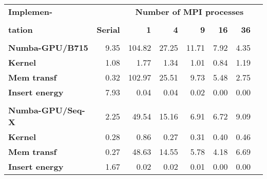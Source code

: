 \begin{tabular}{lrrrrrrr}\toprule
\textbf{Implemen-} & &\multicolumn{5}{c}{\textbf{Number of MPI processes}} \\
\cline{3-7}\vspace{-10pt} & & & & & & \\
\textbf{tation} &\textbf{Serial} &\textbf{1} &\textbf{4} &\textbf{9} &\textbf{16} &\textbf{36} \\
\toprule\vspace{-11pt} & & & & & & \\
\textbf{Numba-GPU/B715} &9.35 &104.82 &27.25 &11.71 &7.92 &4.35 \\
\quad\textbf{Kernel} &1.08 &1.77 &1.34 &1.01 &0.84 &1.19 \\
\quad\textbf{Mem transf} &0.32 &102.97 &25.51 &9.73 &5.48 &2.75 \\
\quad\textbf{Insert energy} &7.93 &0.04 &0.04 &0.02 &0.00 &0.00 \\
\midrule[0.1pt]\vspace{-10pt} & & & & & & \\
\textbf{Numba-GPU/Seq-X} &2.25 &49.54 &15.16 &6.91 &6.72 &9.09 \\
\quad\textbf{Kernel} &0.28 &0.86 &0.27 &0.31 &0.40 &0.46 \\
\quad\textbf{Mem transf} &0.27 &48.63 &14.55 &5.78 &4.18 &6.69 \\
\quad\textbf{Insert energy} &1.67 &0.02 &0.02 &0.01 &0.00 &0.00 \\
\bottomrule
\end{tabular}